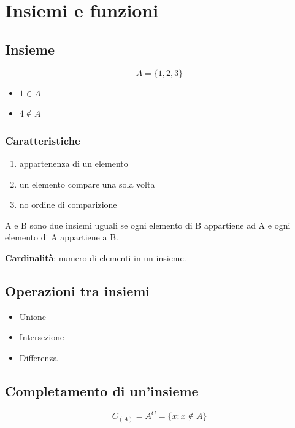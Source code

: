 \section{Insiemi e funzioni}
\subsection{Insieme}

\begin{equation*}
    A = \{1,2,3\}
\end{equation*}

\begin{itemize}
    \item $1 \in A$
    \item $4 \notin A$
\end{itemize}

\subsubsection{Caratteristiche}
\begin{enumerate}
    \item appartenenza di un elemento
    \item un elemento compare una sola volta
    \item no ordine di comparizione
\end{enumerate}

A e B sono due insiemi uguali se ogni elemento di B appartiene ad A e ogni elemento di A appartiene a B.


\textbf{Cardinalità}: numero di elementi in un insieme.

\subsection{Operazioni tra insiemi}
\begin{itemize}
    \item Unione
    \item Intersezione
    \item Differenza
\end{itemize}

\subsection{Completamento di un'insieme}
\begin{equation*}
    C_{(A)} = A^C = \{x : x \notin A\}
\end{equation*}

